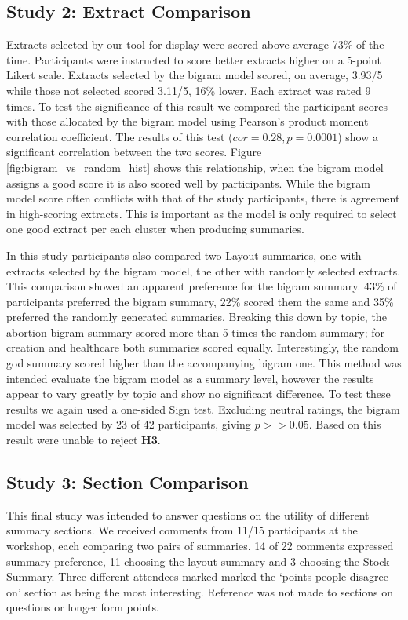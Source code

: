     \tocless\subsection{Study 2: Extract Comparison}
    Extracts selected by our tool for display were scored above average 73\% of the time. Participants were instructed to score better extracts higher on a 5-point Likert scale. Extracts selected by the bigram model scored, on average, 3.93/5 while those not selected scored 3.11/5, 16\% lower. Each extract was rated 9 times. To test the significance of this result we compared the participant scores with those allocated by the bigram model using Pearson's product moment correlation coefficient. The results of this test ($cor = 0.28, p = 0.0001$) show a significant correlation between the two scores. Figure \ref{fig:bigram_vs_random_hist} shows this relationship, when the bigram model assigns a good score it is also scored well by participants. While the bigram model score often conflicts with that of the study participants, there is agreement in high-scoring extracts. This is important as the model is only required to select one good extract per each cluster when producing summaries.

      In this study participants also compared two Layout summaries, one with extracts selected by the bigram model, the other with randomly selected extracts. This comparison showed an apparent preference for the bigram summary. 43\% of participants preferred the bigram summary, 22\% scored them the same and 35\% preferred the randomly generated summaries. Breaking this down by topic, the abortion bigram summary scored more than 5 times the random summary; for creation and healthcare both summaries scored equally. Interestingly, the random god summary scored higher than the accompanying bigram one. This method was intended evaluate the bigram model as a summary level, however the results appear to vary greatly by topic and show no significant difference. To test these results we again used a one-sided Sign test. Excluding neutral ratings, the bigram model was selected by 23 of 42 participants, giving $p >> 0.05$. Based on this result were unable to reject \textbf{H3}.

    \tocless\subsection{Study 3: Section Comparison}
      This final study was intended to answer questions on the utility of different summary sections. We received comments from 11/15 participants at the workshop, each comparing two pairs of summaries. 14 of 22 comments expressed summary preference, 11 choosing the layout summary and 3 choosing the Stock Summary. Three different attendees marked marked the `points people disagree on' section as being the most interesting. Reference was not made to sections on questions or longer form points.

